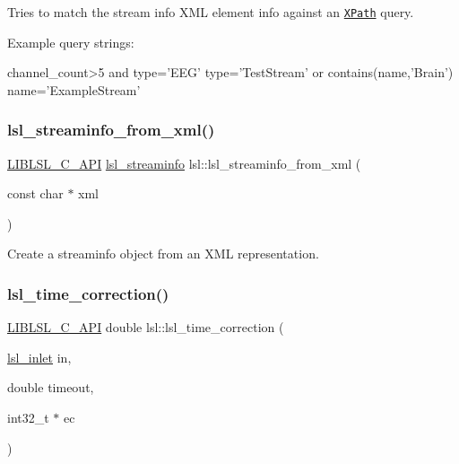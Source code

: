 Tries to match the stream info X\+ML element {\ttfamily info} against an \href{https://en.wikipedia.org/wiki/XPath#Syntax_and_semantics_(XPath_1.0)}{\tt X\+Path} query.

Example query strings\+: 
\begin{DoxyCode}
channel\_count>5 and type=\textcolor{stringliteral}{'EEG'}
type=\textcolor{stringliteral}{'TestStream'} or contains(name,\textcolor{stringliteral}{'Brain'})
name='ExampleStream'
\end{DoxyCode}
 \mbox{\label{namespacelsl_a2cf7fb16bf4029ca632fa5dab930de47}} 
\subsubsection{\texorpdfstring{lsl\+\_\+streaminfo\+\_\+from\+\_\+xml()}{lsl\_streaminfo\_from\_xml()}}
{\footnotesize\ttfamily \hyperlink{lsl__cpp_8h_aafd0ef1813e8be84a1420c4f1df64615}{L\+I\+B\+L\+S\+L\+\_\+\+C\+\_\+\+A\+PI} \hyperlink{namespacelsl_aa0a9ce9956061679949daa2e35aae2e8}{lsl\+\_\+streaminfo} lsl\+::lsl\+\_\+streaminfo\+\_\+from\+\_\+xml (\begin{DoxyParamCaption}\item[{const char $\ast$}]{xml }\end{DoxyParamCaption})}



Create a streaminfo object from an X\+ML representation. 

\mbox{\label{namespacelsl_a4a017b7c6d6fbe056b5394b1edff0994}} 
\subsubsection{\texorpdfstring{lsl\+\_\+time\+\_\+correction()}{lsl\_time\_correction()}}
{\footnotesize\ttfamily \hyperlink{lsl__cpp_8h_aafd0ef1813e8be84a1420c4f1df64615}{L\+I\+B\+L\+S\+L\+\_\+\+C\+\_\+\+A\+PI} double lsl\+::lsl\+\_\+time\+\_\+correction (\begin{DoxyParamCaption}\item[{\hyperlink{namespacelsl_a884a3363cfcba75d7ce8f00c1c4c54f1}{lsl\+\_\+inlet}}]{in,  }\item[{double}]{timeout,  }\item[{int32\+\_\+t $\ast$}]{ec }\end{DoxyParamCaption})}

